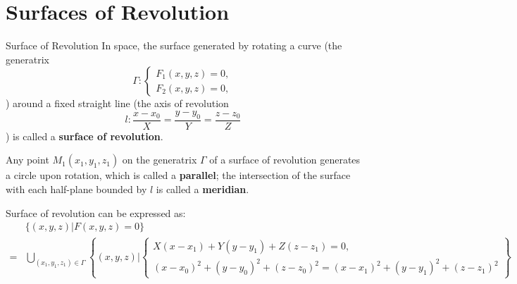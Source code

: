 \documentclass[11pt]{../../TexTemplate/elegantbook} %
\begin{document}
\section{Surfaces of Revolution}
\begin{definition}{Surface of Revolution}
    In space, the surface generated by rotating a curve 
    (the generatrix \[\Gamma : \begin{cases} F_{1}(x,y,z)=0, \\ F_{2}(x,y,z)=0, \end{cases}\]) 
    around a fixed straight line 
    (the axis of revolution \[l: \frac{x-x_{0}}{X} = \frac{y-y_{0}}{Y} = \frac{z-z_{0}}{Z}\]) 
    is called a \textbf{surface of revolution}.

    Any point \(M_{1}(x_{1},y_{1},z_{1})\) on the generatrix \(\Gamma\) of a surface of revolution 
    generates a circle upon rotation, which is called a \textbf{parallel}; 
    the intersection of the surface with each half-plane bounded by \(l\) is called a \textbf{meridian}.
\end{definition}
Surface of revolution can be expressed as:
\begin{align*}
    &\{ (x,y,z) | F(x,y,z) = 0 \} \\
    =&\bigcup_{(x_{1},y_{1},z_{1}) \in \Gamma} 
    \left\{ (x,y,z) | \begin{cases} X(x-x_{1})+Y(y-y_{1})+Z(z-z_{1}) = 0, \\ 
        (x-x_{0})^{2} + (y-y_{0})^{2} + (z-z_{0})^{2} = (x-x_{1})^{2} + (y-y_{1})^{2} + (z-z_{1})^{2} \end{cases} \right\} \\
\end{align*}
\end{document}
